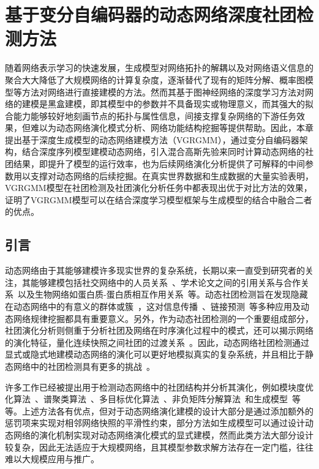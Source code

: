\baselineskip 20pt


\chapter{基于变分自编码器的动态网络深度社团检测方法}
\label{chap:6}

随着网络表示学习的快速发展，生成模型对网络拓扑的解耦以及对网络语义信息的聚合大大降低了大规模网络的计算复杂度，逐渐替代了现有的矩阵分解、概率图模型等方法对网络进行直接建模的方法。然而其基于图神经网络的深度学习方法对网络的建模是黑盒建模，即其模型中的参数并不具备现实或物理意义，而其强大的拟合能力能够较好地刻画节点的拓扑与属性信息，间接支撑复杂网络的下游任务效果，但难以为动态网络演化模式分析、网络功能结构挖掘等提供帮助。因此，本章提出基于深度生成模型的动态网络建模方法（VGRGMM），通过变分自编码器架构，结合深度序列模型建模动态网络，引入混合高斯先验来同时计算动态网络的社团结果，即提升了模型的运行效率，也为后续网络演化分析提供了可解释的中间参数用以支撑对动态网络的后续挖掘。在真实世界数据和生成数据的大量实验表明，VGRGMM模型在社团检测及社团演化分析任务中都表现出优于对比方法的效果，证明了VGRGMM模型可以在结合深度学习模型框架与生成模型的结合中融合二者的优点。



\section{引言\label{chap6:intro}}


动态网络由于其能够建模许多现实世界的复杂系统，长期以来一直受到研究者的关注，其能够建模包括社交网络中的人员关系~\cite{newman2004finding}、学术论文之间的引用关系与合作关系~\cite{gopalan2013efficient,chikhaoui2015new}以及生物网络如蛋白质-蛋白质相互作用关系~\cite{palla2005uncovering,zhang2019relational}等。动态社团检测旨在发现隐藏在动态网络中的有意义的群体或簇~\cite{7384503,rossetti2018community}，这对信息传播~\cite{del2016spreading}、链接预测~\cite{lu2015toward,yu2017link,Ma.2019.Ming}等多种应用及动态网络规律\cite{laurienti2009modularity}挖掘都具有重要意义。另外，作为动态社团检测的一个重要组成部分，社团演化分析则侧重于分析社团及网络在时序演化过程中的模式，还可以揭示网络的演化特征，量化连续快照之间社团的过渡关系~\cite{tang2014detecting}。因此，动态网络社团检测通过显式或隐式地建模动态网络的演化可以更好地模拟真实的复杂系统，并且相比于静态网络中的社团检测具有更多的挑战~\cite{rossetti2018community}。


许多工作已经被提出用于检测动态网络中的社团结构并分析其演化，例如模块度优化算法~\cite{Mucha.2010.Onnela}、谱聚类算法~\cite{liu2018global}、多目标优化算法~\cite{Zhang.2017.Niu,Zhang.2020.Jin}、非负矩阵分解算法~\cite{Ma.2017.Dong}和生成模型~\cite{pensky2019spectral}等等。上述方法各有优点，但对于动态网络演化建模的设计大部分是通过添加额外的惩罚项来实现对相邻网络快照的平滑性约束，部分方法如生成模型可以通过设计动态网络的演化机制实现对动态网络演化模式的显式建模，然而此类方法大部分设计较复杂，因此无法适应于大规模网络，且其模型参数求解方法存在一定门槛，往往难以大规模应用与推广。


